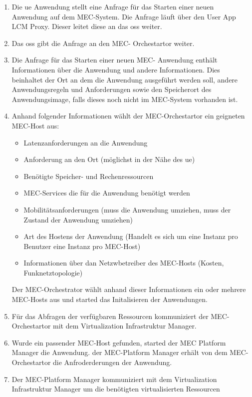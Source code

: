 \documentclass[runningheads]{llncs}
\numberwithin{figure}{section}
\begin{document}
\begin{enumerate}
  \item Die \acrshort{ue} Anwendung stellt eine Anfrage für das Starten einer neuen Anwendung auf dem MEC-System. Die Anfrage läuft über den 
  User App LCM Proxy. Dieser leitet diese an das \acrlong{oss} weiter.
  \item Das \acrshort{oss} gibt die Anfrage an den MEC- Orchestartor weiter.
  \item Die Anfrage für das Starten einer neuen MEC- Anwendung enthält Informationen über 
  die Anwendung und andere Informationen. Dies beinhaltet der Ort an dem die Anwendung ausgeführt werden soll, 
  andere Anwendungsregeln und Anforderungen sowie den Speicherort des Anwendungsimage, 
  falls dieses noch nicht im MEC-System vorhanden ist. 
  \item Anhand folgender Informationen wählt der MEC-Orchestartor ein geigneten MEC-Host aus:
  \begin{itemize}
    \item Latenzanforderungen an die Anwendung
    \item Anforderung an den Ort (möglichst in der Nähe des \acrshort{ue})
    \item Benötigte Speicher- und Rechenressourcen
    \item MEC-Services die für die Anwendung benötigt werden
    \item Mobilitätsanforderungen (muss die Anwendung umziehen, muss der Zustand der Anwendung umziehen)
    \item Art des Hostens der Anwendung (Handelt es sich um eine Instanz pro Benutzer eine Instanz pro MEC-Host)
    \item Informationen über dan Netzwbetreiber des MEC-Hosts (Kosten, Funknetztopologie)
  \end{itemize}
  Der MEC-Orchestrator wählt anhand dieser Informationen ein oder mehrere MEC-Hosts aus und started das Initalisieren der Anwendungen.
  \item Für das Abfragen der verfügbaren Ressourcen kommuniziert der MEC-Orchestartor mit dem Virtualization Infrastruktur Manager.
  \item Wurde ein passender MEC-Host gefunden, started der MEC Platform Manager die Anwendung. der MEC-Platform Manager erhält von dem 
  MEC-Orchestartor die Anfroderderungen der Anwendung.
  \item Der MEC-Platform Manager kommuniziert mit dem Virtualization Infrastruktur Manager um die benötigten virtualisierten Ressourcen 

\end{enumerate}
\end{document}
